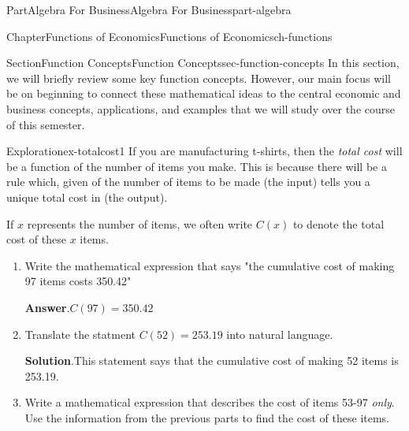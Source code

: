 \documentclass[oneside,10pt,]{tufte-book}
\newcommand{\blocktitlefont}{\relax}
\numberwithin{equation}{chapter}
\begin{document}
\begin{partptx}{Part}{Algebra For Business}{}{Algebra For Business}{}{}{part-algebra}
\renewcommand*{\partname}{Part}
%
\typeout{************************************************}
\typeout{************************************************}
%
\begin{chapterptx}{Chapter}{Functions of Economics}{}{Functions of Economics}{}{}{ch-functions}
\renewcommand*{\chaptername}{Chapter}
%
%
\typeout{************************************************}
\typeout{************************************************}
%
\begin{sectionptx}{Section}{Function Concepts}{}{Function Concepts}{}{}{sec-function-concepts}
In this section, we will briefly review some key function concepts.  However, our main focus will be on beginning to connect these mathematical ideas to the central economic and business concepts, applications, and examples that we will study over the course of this semester.%
\begin{exploration}{Exploration}{}{ex-totalcost1}%
If you are manufacturing t-shirts, then the \emph{total cost} will be a function  of the number of items you make. This is because there will be a rule which, given  of the number of items to be made (the input) tells you a unique total cost in \textdollar{} (the output).%
\par
If \(x\) represents the number of items, we often write \(C(x)\) to denote the total cost of these \(x\) items.%
\begin{enumerate}[font=\bfseries,label=(\alph*),ref=\alph*]%
\item{}Write the mathematical expression that says "the cumulative cost of making 97 items costs \textdollar{}350.42"%
\par\smallskip%
\noindent\textbf{\blocktitlefont Answer}.\hypertarget{ex-totalcost1-2-2}{}\quad{}\(C(97) = 350.42\)%
\item{}Translate the statment \(C(52) = 253.19\) into natural language.%
\par\smallskip%
\noindent\textbf{\blocktitlefont Solution}.\hypertarget{ex-totalcost1-3-2}{}\quad{}This statement says that the cumulative cost of making 52 items is \textdollar{}253.19.%
\item{}Write a mathematical expression that describes the cost of items 53-97 \emph{only}.  Use the information from the previous parts to find the cost of these items.%
\par\smallskip%

\end{enumerate}
\end{exploration}
\end{sectionptx}
\end{chapterptx}
\end{partptx}
\end{document}
